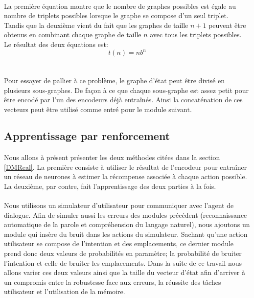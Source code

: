 \paragraph{}La première équation montre que le nombre de graphes possibles est égale au nombre de triplets possibles lorsque le graphe se compose d'un seul triplet. Tandis que la deuxième vient du fait que les graphes de taille $n+1$ peuvent être obtenus en combinant chaque graphe de taille $n$ avec tous les triplets possibles. Le résultat des deux équations est:
\[t(n) = nb^n\]\\
\paragraph{}Pour essayer de pallier à ce problème, le graphe d'état peut être divisé en plusieurs sous-graphes. De façon à ce que chaque sous-graphe est assez petit pour être encodé par l'un des encodeurs déjà entraînés. Ainsi la concaténation de ces vecteurs peut être utilisé comme entré pour le module suivant.
\subsection{Apprentissage par renforcement}
\paragraph{}Nous allons à présent présenter les deux méthodes citées dans la section \ref{DMReal}. La première consiste à utiliser le résultat de l'encodeur pour entraîner un réseau de neurones à estimer la récompense associée à chaque action possible. La deuxième, par contre, fait l'apprentissage des deux parties à la fois.
\paragraph{}Nous utilisons un simulateur d'utilisateur pour communiquer avec l'agent de dialogue. Afin de simuler aussi les erreurs des modules précédent (reconnaissance automatique de la parole et compréhension du langage naturel), nous ajoutons un module qui insère du bruit dans les actions du simulateur. Sachant qu'une action utilisateur se compose de l'intention et des emplacements, ce dernier module prend donc deux valeurs de probabilités en paramètre; la probabilité de bruiter l'intention et celle de bruiter les emplacements. Dans la suite de ce travail nous allons varier ces deux valeurs ainsi que la taille du vecteur d'état afin d'arriver à un compromis entre la robustesse face aux erreurs, la réussite des tâches utilisateur et l’utilisation de la mémoire.
